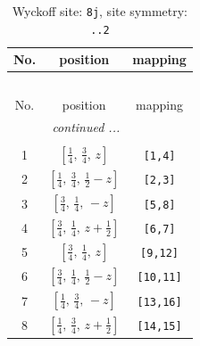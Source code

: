 \documentclass[fleqn,8pt]{jsarticle}
\begin{document}
\begin{longtable}{ccc}
\caption{Wyckoff site: {\tt 8j}, site symmetry: {\tt ..2}}
 \\
 \hline \hline
No. & position & mapping \\ \hline \endfirsthead

\multicolumn{2}{l}{\tablename\ \thetable{}} \\
 \hline \hline
No. & position & mapping \\ \hline \endhead

 \hline \hline
\multicolumn{2}{r}{\footnotesize\it continued ...} \\ \endfoot

 \hline \hline
\multicolumn{2}{r}{} \\ \endlastfoot

1 & $\left[ \frac{1}{4},\, \frac{3}{4},\, z \right]$ & {\tt [1,4]} \\ \hline
2 & $\left[ \frac{1}{4},\, \frac{3}{4},\, \frac{1}{2} - z \right]$ & {\tt [2,3]} \\ \hline
3 & $\left[ \frac{3}{4},\, \frac{1}{4},\, - z \right]$ & {\tt [5,8]} \\ \hline
4 & $\left[ \frac{3}{4},\, \frac{1}{4},\, z + \frac{1}{2} \right]$ & {\tt [6,7]} \\ \hline
5 & $\left[ \frac{3}{4},\, \frac{1}{4},\, z \right]$ & {\tt [9,12]} \\ \hline
6 & $\left[ \frac{3}{4},\, \frac{1}{4},\, \frac{1}{2} - z \right]$ & {\tt [10,11]} \\ \hline
7 & $\left[ \frac{1}{4},\, \frac{3}{4},\, - z \right]$ & {\tt [13,16]} \\ \hline
8 & $\left[ \frac{1}{4},\, \frac{3}{4},\, z + \frac{1}{2} \right]$ & {\tt [14,15]} \\
\end{longtable}
\renewcommand{\arraystretch}{1.2}
\end{document}
